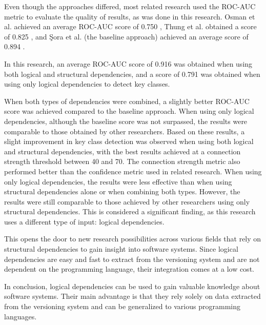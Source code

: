 Even though the approaches differed, most related research used the ROC-AUC metric to evaluate the quality of results, as was done in this research. Osman et al. achieved an average ROC-AUC score of 0.750 \cite{6676885}, Thung et al. obtained a score of 0.825 \cite{rocclasification}, and Şora et al. (the baseline approach) achieved an average score of 0.894 \cite{Finding-key-classes}.

In this research, an average ROC-AUC score of 0.916 was obtained when using both logical and structural dependencies, and a score of 0.791 was obtained when using only logical dependencies to detect key classes.

When both types of dependencies were combined, a slightly better ROC-AUC score was achieved compared to the baseline approach. When using only logical dependencies, although the baseline score was not surpassed, the results were comparable to those obtained by other researchers. Based on these results, a slight improvement in key class detection was observed when using both logical and structural dependencies, with the best results achieved at a connection strength threshold between 40 and 70. The connection strength metric also performed better than the confidence metric used in related research. When using only logical dependencies, the results were less effective than when using structural dependencies alone or when combining both types. However, the results were still comparable to those achieved by other researchers using only structural dependencies. This is considered a significant finding, as this research uses a different type of input: logical dependencies.

This opens the door to new research possibilities across various fields that rely on structural dependencies to gain insight into software systems. Since logical dependencies are easy and fast to extract from the versioning system and are not dependent on the programming language, their integration comes at a low cost.

In conclusion, logical dependencies can be used to gain valuable knowledge about software systems. Their main advantage is that they rely solely on data extracted from the versioning system and can be generalized to various programming languages.
